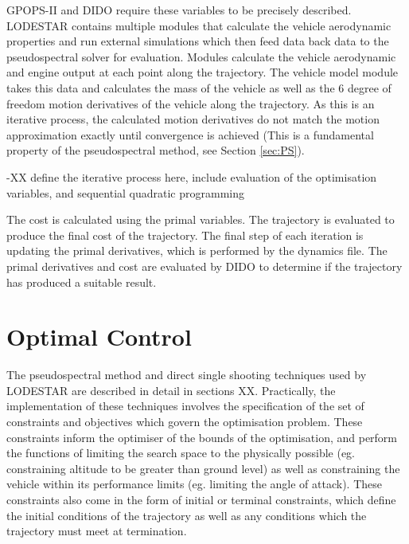 GPOPS-II and DIDO require these variables to be precisely described. LODESTAR contains multiple modules that calculate the vehicle aerodynamic properties and run external simulations which then feed data back data to the pseudospectral solver for evaluation. Modules calculate the vehicle aerodynamic and engine output at each point along the trajectory. The vehicle model module takes this data and calculates the mass of the vehicle as well as the 6 degree of freedom motion derivatives of the vehicle along the trajectory. As this is an iterative process, the calculated motion derivatives do not match the motion approximation exactly until convergence is achieved (This is a fundamental property of the pseudospectral method, see Section \ref{sec:PS}). 

-XX define the iterative process here, include evaluation of the optimisation variables, and sequential quadratic programming

The cost is calculated using the primal variables. The trajectory is evaluated to produce the final cost of the trajectory. The final step of each iteration is updating the primal derivatives, which is performed by the dynamics file. The primal derivatives and cost are evaluated by DIDO to determine if the trajectory has produced a suitable result.


\section{Optimal Control}
The pseudospectral method and direct single shooting techniques used by LODESTAR are described in detail in sections XX. Practically, the implementation of these techniques involves the specification of the set of constraints and objectives which govern the optimisation problem. These constraints inform the optimiser of the bounds of the optimisation, and perform the functions of limiting the search space to the physically possible (eg. constraining altitude to be greater than ground level) as well as constraining the vehicle within its performance limits (eg. limiting the angle of attack). These constraints also come in the form of initial or terminal constraints, which define the initial conditions of the trajectory as well as any conditions which the trajectory must meet at termination. 

